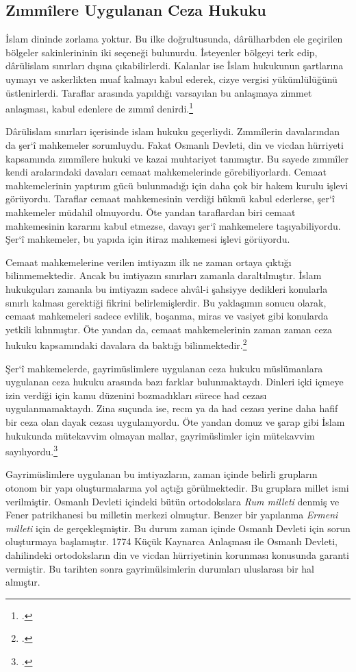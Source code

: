 \subsection{Zımmîlere Uygulanan Ceza Hukuku}
\indent\indent İslam dininde zorlama yoktur. Bu ilke doğrultusunda, dârülharbden ele geçirilen bölgeler sakinlerininin iki seçeneği bulunurdu. İsteyenler bölgeyi terk edip, dârülislam sınırları dışına çıkabilirlerdi. 
Kalanlar ise İslam hukukunun şartlarına uymayı ve askerlikten muaf kalmayı kabul ederek, cizye vergisi yükümlülüğünü üstlenirlerdi. Taraflar arasında yapıldığı varsayılan bu anlaşmaya zimmet anlaşması, kabul edenlere de zımmî denirdi.\footcite[293]{osmanli_hukuku}

Dârülislam sınırları içerisinde islam hukuku geçerliydi. Zımmîlerin davalarından da şer`î mahkemeler sorumluydu. Fakat Osmanlı Devleti, din ve vicdan hürriyeti kapsamında zımmîlere hukuki ve kazai muhtariyet 
tanımıştır. Bu sayede zımmîler kendi aralarındaki davaları cemaat mahkemelerinde görebiliyorlardı. Cemaat mahkemelerinin yaptırım gücü bulunmadığı için daha çok bir hakem kurulu işlevi görüyordu. Taraflar 
cemaat mahkemesinin verdiği hükmü kabul ederlerse, şer`î mahkemeler müdahil olmuyordu. Öte yandan taraflardan biri cemaat mahkemesinin kararını kabul etmezse, davayı şer`î mahkemelere taşıyabiliyordu. Şer`î 
mahkemeler, bu yapıda için itiraz mahkemesi işlevi görüyordu.

Cemaat mahkemelerine verilen imtiyazın ilk ne zaman ortaya çıktığı bilinmemektedir. Ancak bu imtiyazın sınırları zamanla daraltılmıştır. İslam hukukçuları zamanla bu imtiyazın sadece ahvâl-i şahsiyye dedikleri 
konularla sınırlı kalması gerektiği fikrini belirlemişlerdir. Bu yaklaşımın sonucu olarak, cemaat mahkemeleri sadece evlilik, boşanma, miras ve vasiyet gibi konularda yetkili kılınmıştır. Öte yandan da, cemaat 
mahkemelerinin zaman zaman ceza hukuku kapsamındaki davalara da baktığı bilinmektedir.\footcite[297]{osmanli_hukuku}

Şer`î mahkemelerde, gayrimüslimlere uygulanan ceza hukuku müslümanlara uygulanan ceza hukuku arasında bazı farklar bulunmaktaydı. Dinleri içki içmeye izin verdiği için kamu düzenini bozmadıkları sürece had cezası 
uygulanmamaktaydı. Zina suçunda ise, recm ya da had cezası yerine daha hafif bir ceza olan dayak cezası uygulanıyordu. Öte yandan domuz ve şarap gibi İslam hukukunda mütekavvim olmayan mallar, gayrimüslimler için 
mütekavvim sayılıyordu.\footcite[315]{osmanli_hukuku}

Gayrimüslimlere uygulanan bu imtiyazların, zaman içinde belirli grupların otonom bir yapı oluşturmalarına yol açtığı görülmektedir. Bu gruplara millet ismi verilmiştir. Osmanlı Devleti içindeki bütün ortodokslara
\textit{Rum milleti} denmiş ve Fener patrikhanesi bu milletin merkezi olmuştur. Benzer bir yapılanma \textit{Ermeni milleti} için de gerçekleşmiştir. Bu durum zaman içinde Osmanlı Devleti için sorun 
oluşturmaya başlamıştır. 1774 Küçük Kaynarca Anlaşması ile Osmanlı Devleti, dahilindeki ortodoksların din ve vicdan hürriyetinin korunması konusunda garanti vermiştir. Bu tarihten sonra gayrimülsimlerin durumları uluslarası bir hal almıştır.
